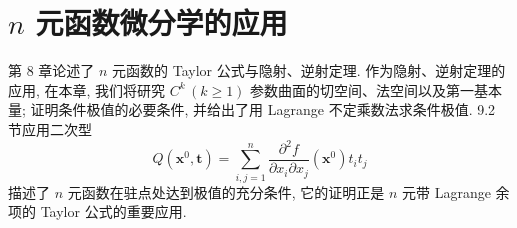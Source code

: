 
\chapter{\texorpdfstring{$n$}{n} 元函数微分学的应用}\label{ch:9}

第 8 章论述了 $n$ 元函数的 Taylor 公式与隐射、逆射定理. 作为隐射、逆射定理的应用, 在本章, 我们将研究 $C^{k}\,(k \geqslant 1)$ 参数曲面的切空间、法空间以及第一基本量; 证明条件极值的必要条件, 并给出了用 Lagrange 不定乘数法求条件极值. 9.2 节应用二次型
\[ Q(\boldsymbol{x}^{0}, \boldsymbol{t}) = \sum_{i, j=1}^{n}\frac{\partial^{2}f}{\partial x_{i}\partial x_{j}}(\boldsymbol{x}^{0})t_{i}t_{j} \]
描述了 $n$ 元函数在驻点处达到极值的充分条件, 它的证明正是 $n$ 元带 Lagrange 余项的 Taylor 公式的重要应用.





